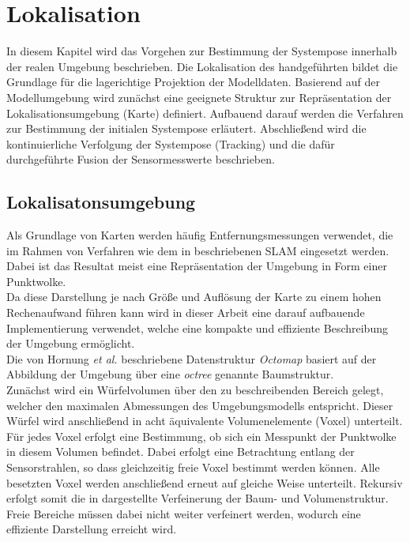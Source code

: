 \chapter{Lokalisation}
\label{chap.loc}

In diesem Kapitel wird das Vorgehen zur Bestimmung der Systempose innerhalb der realen Umgebung beschrieben. Die Lokalisation des handgeführten  bildet die Grundlage für die lagerichtige Projektion der Modelldaten. Basierend auf der Modellumgebung wird zunächst eine geeignete Struktur zur Repräsentation der Lokalisationsumgebung (Karte) definiert. Aufbauend darauf werden die Verfahren zur Bestimmung der initialen Systempose erläutert. Abschließend wird die kontinuierliche Verfolgung der Systempose (Tracking) und die dafür durchgeführte Fusion der Sensormesswerte beschrieben.

\section{Lokalisatonsumgebung}
\label{chap.map}
Als Grundlage von Karten werden häufig Entfernungsmessungen verwendet, die im Rahmen von Verfahren wie dem in  beschriebenen SLAM eingesetzt werden. Dabei ist das Resultat meist eine Repräsentation der Umgebung in Form einer Punktwolke.\\
Da diese Darstellung je nach Größe und Auflösung der Karte zu einem hohen Rechenaufwand führen kann wird in dieser Arbeit eine darauf aufbauende Implementierung \cite{Octomap} verwendet, welche eine kompakte und effiziente Beschreibung der Umgebung ermöglicht.\\

Die von Hornung \textit{et al.} \cite{Hornung2013} beschriebene Datenstruktur \textit{Octomap} basiert auf der Abbildung der Umgebung über eine \textit{octree} genannte Baumstruktur.\\
Zunächst wird ein Würfelvolumen über den zu beschreibenden Bereich gelegt, welcher den maximalen Abmessungen des Umgebungsmodells entspricht. Dieser Würfel wird anschließend in acht äquivalente Volumenelemente (Voxel) unterteilt. Für jedes Voxel erfolgt eine Bestimmung, ob sich ein Messpunkt der Punktwolke in diesem Volumen befindet. Dabei erfolgt eine Betrachtung entlang der Sensorstrahlen, so dass gleichzeitig freie Voxel bestimmt werden können. Alle besetzten Voxel werden anschließend erneut auf gleiche Weise unterteilt. Rekursiv erfolgt somit die in  dargestellte Verfeinerung der Baum- und Volumenstruktur. Freie Bereiche müssen dabei nicht weiter verfeinert werden, wodurch eine effiziente Darstellung erreicht wird.\\

